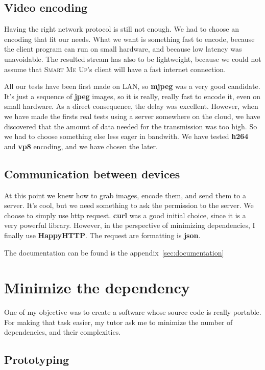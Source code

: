 \documentclass[a4paper,11pt]{custom}
\newcommand{\smu}{\textsc{Smart Me Up}\xspace}
\newcommand{\curl}{\textbf{curl}\xspace}
\newcommand{\happyhttp}{\textbf{HappyHTTP}\xspace}
\newcommand{\mjpeg}{\textbf{mjpeg}\xspace}
\newcommand{\jpeg}{\textbf{jpeg}\xspace}
\newcommand{\vpx}{\textbf{vp8}\xspace}
\newcommand{\mpeg}{\textbf{h264}\xspace}
\newcommand{\json}{\textbf{json}\xspace}
\begin{document}
\subsection{Video encoding}

Having the right network protocol is still not enough. We had to choose an
encoding that fit our needs. What we want is something fast to encode,
because the client program can run on small hardware, and because low latency
was unavoidable. The resulted stream has also to be lightweight, because we
could not assume that \smu's client will have a fast internet connection.

All our tests have been first made on LAN, so \mjpeg{} was a very good
candidate. It's just a sequence of \jpeg{} images, so it is really, really fast
to encode it, even on small hardware. As a direct consequence, the delay was
excellent. However, when we have made the firsts real tests using a server
somewhere on the cloud, we have discovered that the amount of data needed for the
transmission was too high. So we had to choose something else less eager in
bandwith. We have tested \mpeg{} and \vpx encoding, and we have chosen the later.

\subsection{Communication between devices}
\label{sec:communication}

At this point we knew how to grab images, encode them, and send them to a
server. It's cool, but we need something to ask the permission to the server. We
choose to simply use http request. \curl{} was a good initial choice, since it
is a very powerful library. However, in the perspective of minimizing dependencies,
I finally use \happyhttp. The request are formatting is \json.

The documentation can be found is the appendix~\ref{sec:documentation}

\section{Minimize the dependency}

One of my objective was to create a software whose source code is really
portable. For making that task easier, my tutor ask me to minimize the number of
dependencies, and their complexities.

\subsection{Prototyping}
\end{document}
